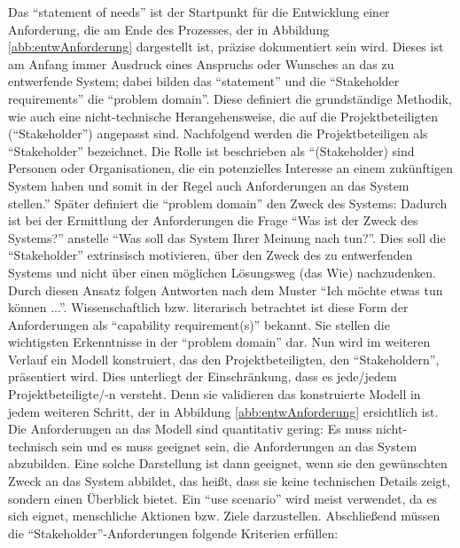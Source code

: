 Das \enquote{statement of needs} ist der Startpunkt für die Entwicklung einer Anforderung, die am Ende des Prozesses, der in Abbildung \vref{abb:entwAnforderung} dargestellt ist, präzise dokumentiert sein wird. Dieses ist am Anfang immer Ausdruck eines Anspruchs oder Wunsches an das zu entwerfende System; dabei bilden das \enquote{statement} und die \enquote{Stakeholder requirements} die \enquote{problem domain}. Diese definiert die grundständige Methodik, wie auch eine nicht-technische Herangehensweise, die auf die Projektbeteiligten (\enquote{Stakeholder}) angepasst sind. Nachfolgend werden die Projektbeteiligen als \enquote{Stakeholder} bezeichnet. Die Rolle ist beschrieben als \enquote{(Stakeholder) sind Personen oder Organisationen, die ein potenzielles Interesse an einem zukünftigen System haben und somit in der Regel auch Anforderungen an das System stellen.}\autocite[][S.\,8]{partsch_requirements-engineering_2010} Später definiert die \enquote{problem domain} den Zweck des Systems: Dadurch ist bei der Ermittlung der Anforderungen die Frage \enquote{Was ist der Zweck des Systems?} anstelle \enquote{Was soll das System Ihrer Meinung nach tun?}. Dies soll die \enquote{Stakeholder} extrinsisch motivieren, über den Zweck des zu entwerfenden Systems und nicht über einen möglichen Lösungsweg (das Wie) nachzudenken. Durch diesen Ansatz folgen Antworten nach dem Muster \enquote{Ich möchte etwas tun können ...}. Wissenschaftlich bzw. literarisch betrachtet ist diese Form der Anforderungen als \enquote{capability requirement(s)}\autocite[vgl.][S.\,94]{hull_requirements_2011} bekannt. Sie stellen die wichtigsten Erkenntnisse in der \enquote{problem domain} dar. Nun wird im weiteren Verlauf ein Modell konstruiert, das den Projektbeteiligten, den \enquote{Stakeholdern}, präsentiert wird. Dies unterliegt der Einschränkung, dass es jede/jedem Projektbeteiligte/-n versteht. Denn sie validieren das konstruierte Modell in jedem weiteren Schritt, der in Abbildung \vref{abb:entwAnforderung} ersichtlich ist. Die Anforderungen an das Modell sind quantitativ gering: Es muss nicht-technisch sein und es muss geeignet sein, die Anforderungen an das System abzubilden. Eine solche Darstellung ist dann geeignet, wenn sie den gewünschten Zweck an das System abbildet, das heißt, dass sie keine technischen Details zeigt, sondern einen Überblick bietet. Ein \enquote{use scenario}\autocite[vgl.][S.\,94]{hull_requirements_2011} wird meist verwendet, da es sich eignet, menschliche Aktionen bzw. Ziele darzustellen. Abschließend müssen die \enquote{Stakeholder}-Anforderungen folgende Kriterien erfüllen: 

